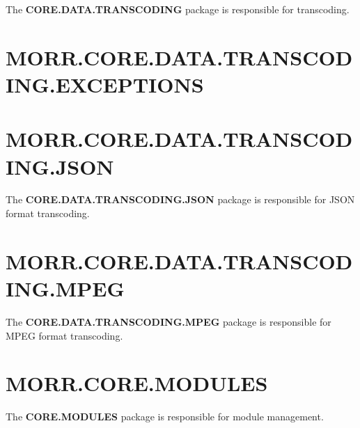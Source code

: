 The \textbf{CORE.DATA.TRANSCODING} package is responsible for transcoding.

\begin{packif}
\end{packif}

\begin{packpack}
\end{packpack}

\section*{MORR.CORE.DATA.TRANSCODING.EXCEPTIONS}

\begin{packclass}
\end{packclass}

\section*{MORR.CORE.DATA.TRANSCODING.JSON}

The \textbf{CORE.DATA.TRANSCODING.JSON} package is responsible for JSON format transcoding.

\begin{packclass}
\end{packclass}

\section*{MORR.CORE.DATA.TRANSCODING.MPEG}

The \textbf{CORE.DATA.TRANSCODING.MPEG} package is responsible for MPEG format transcoding.

\begin{packclass}
\end{packclass}

\section*{MORR.CORE.MODULES}

The \textbf{CORE.MODULES} package is responsible for module management.

\begin{packif}
\end{packif}


